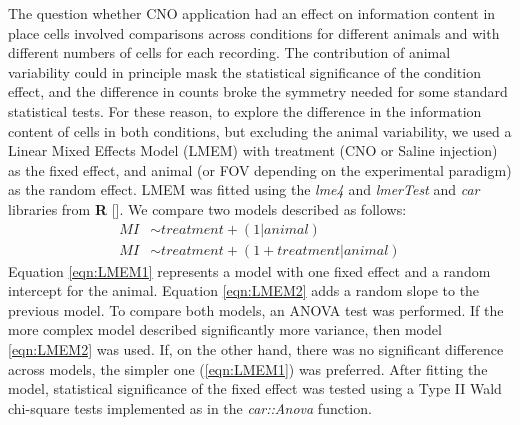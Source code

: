 The question whether CNO application had an effect on information content in place cells involved comparisons across conditions for different animals and with different numbers of cells for each recording.
The contribution of animal variability could in principle mask the statistical significance of the condition effect, and the difference in counts broke the symmetry needed for some standard statistical tests. 
For these reason, to explore the difference in the information content of cells in both conditions, but excluding the animal variability, we used a Linear Mixed Effects Model (LMEM) with treatment (CNO or Saline injection) as the fixed effect, and animal (or FOV depending on the experimental paradigm) as the random effect. 
LMEM was fitted using the \textit{lme4} and \textit{lmerTest} and \textit{car} libraries from \textbf{R} [\cite{Rsoftware}]. 
We compare two models described as follows:
\begin{align}
    MI & \sim treatment + (1|animal) \label{eqn:LMEM1} \\
    MI & \sim treatment + (1+treatment|animal) \label{eqn:LMEM2}
\end{align}
Equation \ref{eqn:LMEM1} represents a model with one fixed effect and a random intercept for the animal. 
Equation \ref{eqn:LMEM2} adds a random slope to the previous model. 
To compare both models, an ANOVA test was performed. If the more complex model described significantly more variance, then model \ref{eqn:LMEM2} was used.
If, on the other hand, there was no significant difference across models, the simpler one (\ref{eqn:LMEM1}) was preferred. 
After fitting the model, statistical significance of the fixed effect was tested using a Type II Wald chi-square tests implemented as in the \textit{car::Anova} function.



